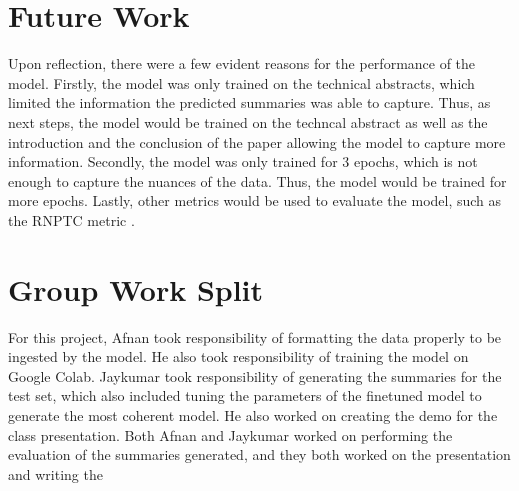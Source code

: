 \documentclass[11pt,a4paper]{article}
\begin{document}
\section{Future Work}

\indent \indent Upon reflection, there were a few evident reasons for the performance of the model. Firstly, the model was only trained on the technical abstracts, which limited the information the predicted summaries was able to capture. Thus, as next steps, the model would be trained on the techncal abstract as well as the introduction and the conclusion of the paper allowing the model to capture more information. Secondly, the model was only trained for 3 epochs, which is not enough to capture the nuances of the data. Thus, the model would be trained for more epochs. Lastly, other metrics would be used to evaluate the model, such as the RNPTC metric \cite{luo2022readability}.

\appendix

\section{Group Work Split}
For this project, Afnan took responsibility of formatting the data properly to be ingested by the model. He also took responsibility of training the model on Google Colab. Jaykumar took responsibility of generating the summaries for the test set, which also included tuning the parameters of the finetuned model to generate the most coherent model. He also worked on creating the demo for the class presentation. Both Afnan and Jaykumar worked on performing the evaluation of the summaries generated, and they both worked on the presentation and writing the



\end{document}
